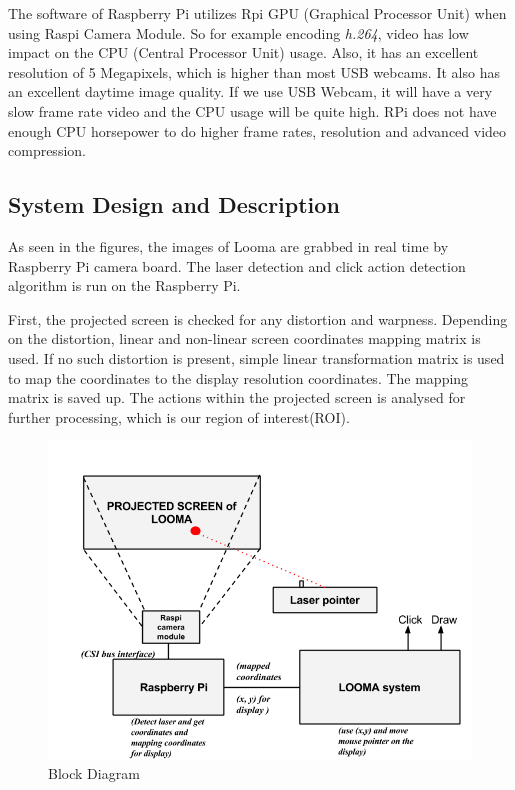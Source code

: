 \documentclass[12pt, a4paper]{article}
\begin{document}
The software of Raspberry Pi utilizes Rpi GPU (Graphical Processor Unit) when using Raspi Camera Module. So for example encoding \emph {h.264}, video has low impact on the CPU (Central Processor Unit) usage. Also, it has an excellent resolution of 5 Megapixels, which is higher than most USB webcams. It also has an excellent daytime image quality. If we use USB Webcam, it will have a very slow frame rate video and the CPU usage will be quite high. RPi does not have enough CPU horsepower to do higher frame rates, resolution and advanced video compression. 

\subsection{System Design and Description}
As seen in the figures, the images of Looma are grabbed in real time by Raspberry Pi camera board. The laser detection and click action detection algorithm is run on the Raspberry Pi.

First, the projected screen is checked for any distortion and warpness. Depending on the distortion, linear and non-linear screen coordinates mapping matrix is used. If no such distortion is present, simple linear transformation matrix is used to map the coordinates to the display resolution coordinates. The mapping matrix is saved up. The actions within the projected screen is analysed for further processing, which is our region of interest(ROI).

\begin{figure}[htp]
\includegraphics[scale=0.5]{proposed_system}
\caption{ Block Diagram}
\label{Block Diagram}
\end{figure}
\end{document}
